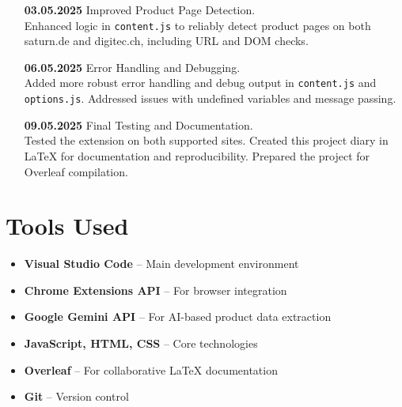 \documentclass{article}
\begin{document}
\begin{itemize}
  \item[\textbf{03.05.2025}] Improved Product Page Detection.\\
  Enhanced logic in \texttt{content.js} to reliably detect product pages on both saturn.de and digitec.ch, including URL and DOM checks.

  \item[\textbf{06.05.2025}] Error Handling and Debugging.\\
  Added more robust error handling and debug output in \texttt{content.js} and \texttt{options.js}. Addressed issues with undefined variables and message passing.

  \item[\textbf{09.05.2025}] Final Testing and Documentation.\\
  Tested the extension on both supported sites. Created this project diary in LaTeX for documentation and reproducibility. Prepared the project for Overleaf compilation.
\end{itemize}

\section*{Tools Used}
\begin{itemize}
  \item \textbf{Visual Studio Code} -- Main development environment
  \item \textbf{Chrome Extensions API} -- For browser integration
  \item \textbf{Google Gemini API} -- For AI-based product data extraction
  \item \textbf{JavaScript, HTML, CSS} -- Core technologies
  \item \textbf{Overleaf} -- For collaborative LaTeX documentation
  \item \textbf{Git} -- Version control
\end{itemize}
\end{document}
